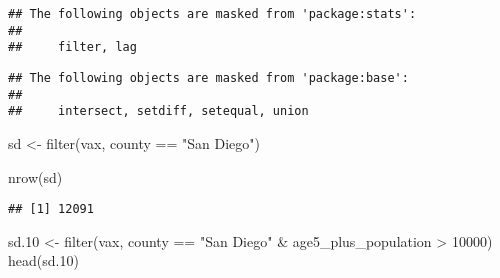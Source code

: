 \documentclass[
]{article}
\newenvironment{Shaded}{\begin{snugshade}}{\end{snugshade}}
\newcommand{\DecValTok}[1]{\textcolor[rgb]{0.00,0.00,0.81}{#1}}
\newcommand{\FloatTok}[1]{\textcolor[rgb]{0.00,0.00,0.81}{#1}}
\newcommand{\FunctionTok}[1]{\textcolor[rgb]{0.00,0.00,0.00}{#1}}
\newcommand{\NormalTok}[1]{#1}
\newcommand{\OtherTok}[1]{\textcolor[rgb]{0.56,0.35,0.01}{#1}}
\newcommand{\SpecialCharTok}[1]{\textcolor[rgb]{0.00,0.00,0.00}{#1}}
\newcommand{\StringTok}[1]{\textcolor[rgb]{0.31,0.60,0.02}{#1}}
\begin{document}
\begin{verbatim}
## The following objects are masked from 'package:stats':
## 
##     filter, lag
\end{verbatim}

\begin{verbatim}
## The following objects are masked from 'package:base':
## 
##     intersect, setdiff, setequal, union
\end{verbatim}

\begin{Shaded}
\begin{Highlighting}[]
\NormalTok{sd }\OtherTok{\textless{}{-}} \FunctionTok{filter}\NormalTok{(vax, county }\SpecialCharTok{==} \StringTok{"San Diego"}\NormalTok{)}

\FunctionTok{nrow}\NormalTok{(sd)}
\end{Highlighting}
\end{Shaded}

\begin{verbatim}
## [1] 12091
\end{verbatim}

\begin{Shaded}
\begin{Highlighting}[]
\NormalTok{sd}\FloatTok{.10} \OtherTok{\textless{}{-}} \FunctionTok{filter}\NormalTok{(vax, county }\SpecialCharTok{==} \StringTok{"San Diego"} \SpecialCharTok{\&}
\NormalTok{                age5\_plus\_population }\SpecialCharTok{\textgreater{}} \DecValTok{10000}\NormalTok{)}
\FunctionTok{head}\NormalTok{(sd}\FloatTok{.10}\NormalTok{)}
\end{Highlighting}
\end{Shaded}
\end{document}
